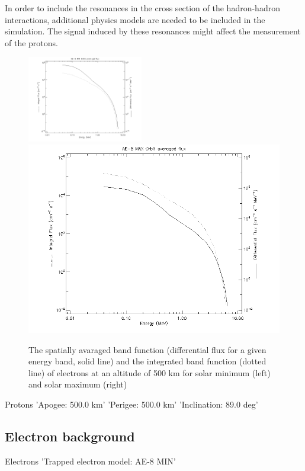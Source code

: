 \documentclass[12pt, a4paper,titlepage]{article}
\numberwithin{equation}{section}
\numberwithin{figure}{section}
\begin{document}
In order to include the resonances in the cross section of the hadron-hadron interactions, additional physics models are needed to be included in the simulation. The signal induced by these resonances might affect the measurement of the protons.


\begin{figure}[htbp]
 \centering %
 \includegraphics[width=0.45\textwidth,origin=c,angle=0]{images/alt_500km_AE-8_MIN_averaged_spectra.png}
 \qquad
 \includegraphics[width=.45\textwidth,origin=c]{images/alt_500km_AE-8_MAX_averaged_spectra.png} 
 \caption{\label{fig:band500e} The spatially avaraged band function (differential flux for a given energy band, solid line) and the integrated band function (dotted line) of electrons at an altitude of 500 km for solar minimum (left) and solar maximum (right) }
 \end{figure}


Protons
'Apogee: 500.0 km'
'Perigee: 500.0 km'
'Inclination: 89.0 deg'

\subsection{Electron background}

Electrons
'Trapped electron model: AE-8 MIN'
\end{document}

